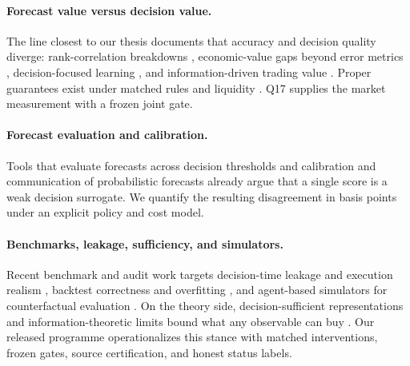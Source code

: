 \paragraph{Forecast value versus decision value.} The line closest to our thesis documents that
accuracy and decision quality diverge: rank-correlation breakdowns \citep{falezza2026when,
raeth2025forecast}, economic-value gaps beyond error metrics \citep{maciejowska2025statistical,
kath2018value, hirsch2026probabilistic, walid2025economic}, decision-focused learning
\citep{wilder2018melding, zhou2024decision, silvestri2023score, islam2023optimizing,
tankov2021decision}, and information-driven trading value \citep{samuel2020information}. Proper
guarantees exist under matched rules and liquidity \citep{anri2026when, dubach2026anatomy}. Q17
supplies the market measurement with a frozen joint gate.

\paragraph{Forecast evaluation and calibration.} Tools that evaluate forecasts across decision
thresholds \citep{f2017murphy, timo2023evaluating, werner2015quantiles, taggart2021point,
allen2024tail, bouallegue2015quantile} and calibration and communication of probabilistic
forecasts \citep{graziani2019probabilistic, loveday2023user, raftery2014use, crisostomo2018financial}
already argue that a single score is a weak decision surrogate. We quantify the resulting
disagreement in basis points under an explicit policy and cost model.

\paragraph{Benchmarks, leakage, sufficiency, and simulators.} Recent benchmark and audit work
targets decision-time leakage and execution realism \citep{fan2026when, junyi2026beyond,
pu2026polybench, wang2025fintsbridge}, backtest correctness and overfitting
\citep{low2015correctness, koshiyama2019avoiding, pham2026algoxpert, sun2022backtesting,
maierpaape2014backtest}, and agent-based simulators for counterfactual evaluation
\citep{dwarakanath2024abides, vyetrenko2019risk}. On the theory side, decision-sufficient
representations and information-theoretic limits bound what any observable can buy
\citep{ye2026learning, walsh2026support, maurice2026forecastability, yoon2026finite}. Our
released programme operationalizes this stance with matched interventions, frozen gates, source
certification, and honest status labels.
